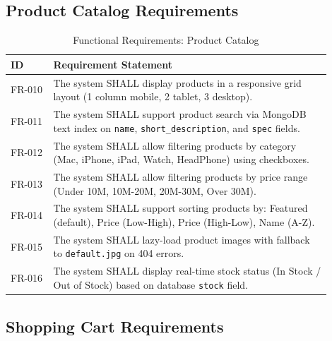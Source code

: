 \documentclass[12pt, a4paper]{report}
\begin{document}
\subsection{Product Catalog Requirements}

\begin{table}[H]
\centering
\caption{Functional Requirements: Product Catalog}
\label{tab:fr_products}
\small
\begin{tabular}{@{}p{0.12\linewidth}p{0.78\linewidth}@{}}
\toprule
\textbf{ID} & \textbf{Requirement Statement} \\
\midrule
FR-010 & The system SHALL display products in a responsive grid layout (1 column mobile, 2 tablet, 3 desktop). \\
FR-011 & The system SHALL support product search via MongoDB text index on \texttt{name}, \texttt{short\_description}, and \texttt{spec} fields. \\
FR-012 & The system SHALL allow filtering products by category (Mac, iPhone, iPad, Watch, HeadPhone) using checkboxes. \\
FR-013 & The system SHALL allow filtering products by price range (Under 10M, 10M-20M, 20M-30M, Over 30M). \\
FR-014 & The system SHALL support sorting products by: Featured (default), Price (Low-High), Price (High-Low), Name (A-Z). \\
FR-015 & The system SHALL lazy-load product images with fallback to \texttt{default.jpg} on 404 errors. \\
FR-016 & The system SHALL display real-time stock status (In Stock / Out of Stock) based on database \texttt{stock} field. \\
\bottomrule
\end{tabular}
\end{table}

\subsection{Shopping Cart Requirements}
\end{document}
